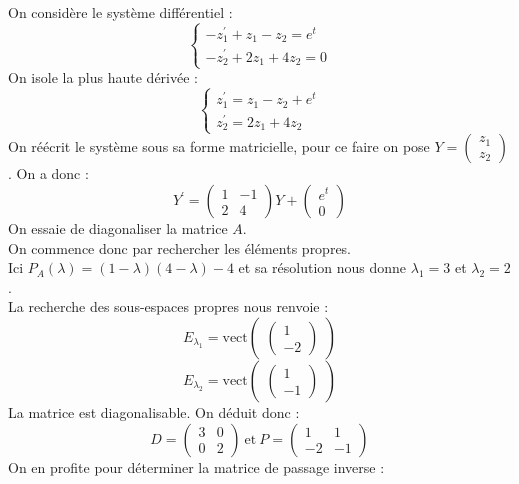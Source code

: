 \begin{ex}
On considère le système différentiel :
$$\begin{cases}
-z_1^{\prime}+z_1-z_2=e^{t}\\
-z_2^{\prime}+2z_1+4z_2=0
\end{cases}$$
On isole la plus haute dérivée :
$$\begin{cases}
z_1^{\prime}=z_1-z_2+e^{t}\\
z_2^{\prime}=2z_1+4z_2
\end{cases}$$
On réécrit le système sous sa forme matricielle, pour ce faire on pose $Y=\begin{pmatrix}z_1\\z_2\end{pmatrix}$. On a donc :
$$Y^{\prime}=\begin{pmatrix}1&-1\\2&4\end{pmatrix}Y+\begin{pmatrix}e^t\\0\end{pmatrix}$$
On essaie de diagonaliser la matrice $A$.\\
On commence donc par rechercher les éléments propres.\\
Ici $P_A(\lambda)=(1-\lambda)(4-\lambda)-4$ et sa résolution nous donne $\lambda_1=3$ et $\lambda_2=2$.\\
La recherche des sous-espaces propres nous renvoie :
$$E_{\lambda_1}=\text{vect}\begin{pmatrix}\begin{pmatrix}1\\-2\end{pmatrix}\end{pmatrix}$$
$$E_{\lambda_2}=\text{vect}\begin{pmatrix}\begin{pmatrix}1\\-1\end{pmatrix}\end{pmatrix}$$
La matrice est diagonalisable. On déduit donc :\\
$$D=\begin{pmatrix}3&0\\0&2\end{pmatrix}\ \text{et}\ P=\begin{pmatrix}1&1\\-2&-1\end{pmatrix}$$
On en profite pour déterminer la matrice de passage inverse :
\begin{align*}

\end{align*}
\end{ex}
